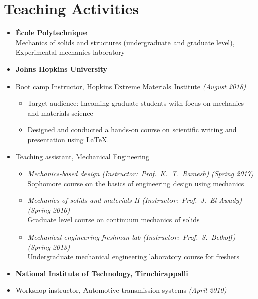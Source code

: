 \documentclass[a4paper,10pt, oneside]{article}
\begin{document}
	\section*{{Teaching Activities}}
	\begin{itemize}[wide, labelwidth=!, labelindent=-1em]
		\item[]\textbf{{\'E}cole Polytechnique} \\
		Mechanics of solids and structures (undergraduate and graduate level), Experimental mechanics laboratory
		\item[]\textbf{Johns Hopkins University}
		\item[]Boot camp Instructor, Hopkins Extreme Materials Institute \hfill \textit{(August 2018)}
		\begin{itemize}[wide, labelwidth=!, labelindent=0em]
			\item Target audience: Incoming graduate students with focus on mechanics and materials science
			\item Designed and conducted a hands-on course on scientific writing and presentation using \LaTeX.
		\end{itemize}
		\vspace*{0.5em}
		\item[]Teaching assistant, Mechanical Engineering
		\begin{itemize}[wide, labelwidth=!, labelindent=0em]
			\item \textit{Mechanics-based design ({Instructor}:~Prof.~K.~T.~Ramesh)} \hfill \textit{(Spring 2017)} \\
			Sophomore course on the basics of engineering design using mechanics
			\item \textit{Mechanics of solids and materials II (Instructor:~Prof.~J.~El-Awady)} \hfill \textit{(Spring 2016)} \\
			Graduate level course on continuum mechanics of solids
			\item \textit{Mechanical engineering freshman lab (Instructor:~Prof.~S.~Belkoff)} \hfill \textit{(Spring 2013)} \\
			Undergraduate mechanical engineering laboratory course for freshers
		\end{itemize}
		\vspace*{0.5em}
		\item[]\textbf{National Institute of Technology, Tiruchirappalli}
		\item[]Workshop instructor, Automotive transmission systems \hfill \textit{(April 2010)}
	\end{itemize}
	
\end{document}
